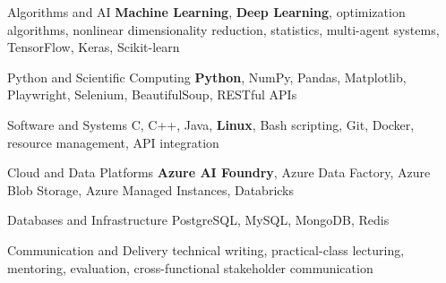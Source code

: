 \begin{cvskills}
  \cvskill
    {Algorithms and AI}
    {\textbf{Machine Learning}, \textbf{Deep Learning}, optimization algorithms, nonlinear dimensionality reduction, statistics, multi-agent systems, TensorFlow, Keras, Scikit-learn}

  \cvskill
    {Python and Scientific Computing}
    {\textbf{Python}, NumPy, Pandas, Matplotlib, Playwright, Selenium, BeautifulSoup, RESTful APIs}

  \cvskill
    {Software and Systems}
    {C, C++, Java, \textbf{Linux}, Bash scripting, Git, Docker, resource management, API integration}

  \cvskill
    {Cloud and Data Platforms}
    {\textbf{Azure AI Foundry}, Azure Data Factory, Azure Blob Storage, Azure Managed Instances, Databricks}

  \cvskill
    {Databases and Infrastructure}
    {PostgreSQL, MySQL, MongoDB, Redis}

  \cvskill
    {Communication and Delivery}
    {technical writing, practical-class lecturing, mentoring, evaluation, cross-functional stakeholder communication}
\end{cvskills}

